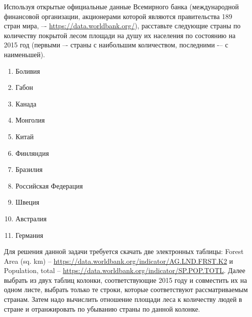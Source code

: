 
Используя открытые официальные данные Всемирного банка (международной финансовой организации, акционерами которой являются правительства 189 стран мира, –- \url{https://data.worldbank.org/}), расставьте следующие страны по количеству покрытой лесом площади на душу их населения по состоянию на 2015 год (первыми –- страны с наибольшим количеством, последними -– с наименьшей).

\begin{enumerate}
    \item Боливия
    \item Габон
    \item Канада
    \item Монголия
    \item Китай
    \item Финляндия
    \item Бразилия
    \item Российская Федерация
    \item Швеция
    \item Австралия
    \item Германия
\end{enumerate}

\solutionSection
Для решения данной задачи требуется скачать две электронных таблицы: Forest Area (sq. km) -- \url{https://data.worldbank.org/indicator/AG.LND.FRST.K2} и \linebreak Population, total -- \url{https://data.worldbank.org/indicator/SP.POP.TOTL}. Далее выбрать из двух таблиц колонки, соответствующие 2015 году и совместить их на одном листе, выбрать только те строки, которые соответствуют рассматриваемым странам. Затем надо вычислить отношение площади леса к количеству людей в стране и отранжировать по убыванию страны по данной колонке.

